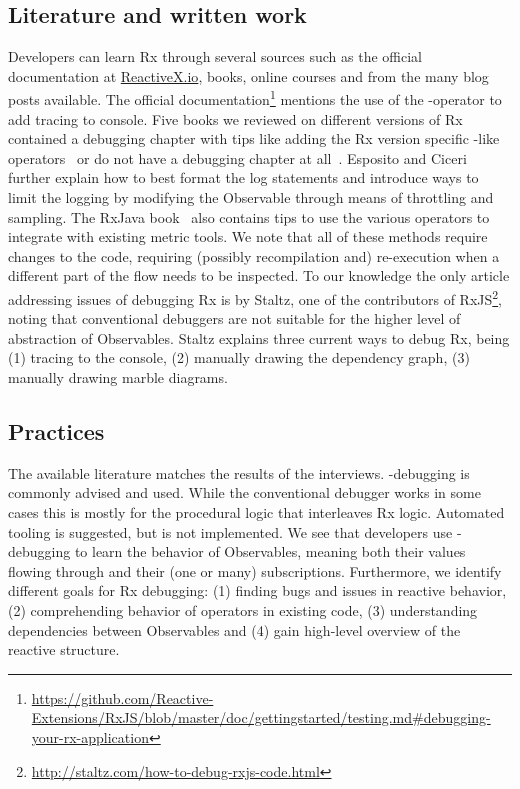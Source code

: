 \subsection{Literature and written work}
Developers can learn Rx through several sources such as the official documentation at \href{http://reactivex.io}{ReactiveX.io}, books, online courses and from the many blog posts available. The official documentation\footnote{
	\url{https://github.com/Reactive-Extensions/RxJS/blob/master/doc/gettingstarted/testing.md\#debugging-your-rx-application}
} mentions the use of the -operator to add tracing to console. Five books we reviewed on different versions of Rx contained a debugging chapter with tips like adding the Rx version specific -like operators~\cite{esposito2016reactive,rxjavabook2016} or do not have a debugging chapter at all~\cite{introtorx, rxjavabook2015, rxswiftbook2017}. Esposito and Ciceri~\cite{esposito2016reactive} further explain how to best format the log statements and introduce ways to limit the logging by modifying the Observable through means of throttling and sampling. The RxJava book~\cite{rxjavabook2016} also contains tips to use the various  operators to integrate with existing metric tools. We note that all of these methods require changes to the code, requiring (possibly recompilation and) re-execution when a different part of the flow needs to be inspected.
To our knowledge the only article addressing issues of debugging Rx is by Staltz, one of the contributors of RxJS\footnote{\url{http://staltz.com/how-to-debug-rxjs-code.html}}, noting that conventional debuggers are not suitable for the higher level of abstraction of Observables. Staltz explains three current ways to debug Rx, being (1) tracing to the console, (2) manually drawing the dependency graph, (3) manually drawing marble diagrams.

\subsection{Practices}
The available literature matches the results of the interviews. -debugging is commonly advised and used. While the conventional debugger works in some cases this is mostly for the procedural logic that interleaves Rx logic. Automated tooling is suggested, but is not implemented. We see that developers use -debugging to learn the behavior of Observables, meaning both their values flowing through and their (one or many) subscriptions. Furthermore, we identify different goals for Rx debugging:
(1) finding bugs and issues in reactive behavior,
(2) comprehending behavior of operators in existing code,
(3) understanding dependencies between Observables and
(4) gain high-level overview of the reactive structure.
